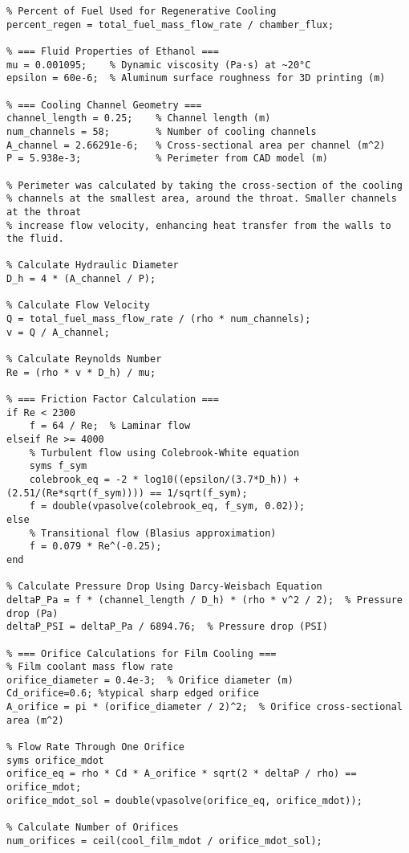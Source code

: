\begin{verbatim}
% Percent of Fuel Used for Regenerative Cooling
percent_regen = total_fuel_mass_flow_rate / chamber_flux;  

% === Fluid Properties of Ethanol ===
mu = 0.001095;    % Dynamic viscosity (Pa·s) at ~20°C
epsilon = 60e-6;  % Aluminum surface roughness for 3D printing (m)

% === Cooling Channel Geometry ===
channel_length = 0.25;    % Channel length (m)
num_channels = 58;        % Number of cooling channels
A_channel = 2.66291e-6;   % Cross-sectional area per channel (m^2)
P = 5.938e-3;             % Perimeter from CAD model (m)

% Perimeter was calculated by taking the cross-section of the cooling
% channels at the smallest area, around the throat. Smaller channels at the throat 
% increase flow velocity, enhancing heat transfer from the walls to the fluid.

% Calculate Hydraulic Diameter
D_h = 4 * (A_channel / P);  

% Calculate Flow Velocity
Q = total_fuel_mass_flow_rate / (rho * num_channels);  
v = Q / A_channel;    

% Calculate Reynolds Number
Re = (rho * v * D_h) / mu;

% === Friction Factor Calculation ===
if Re < 2300
    f = 64 / Re;  % Laminar flow
elseif Re >= 4000
    % Turbulent flow using Colebrook-White equation
    syms f_sym
    colebrook_eq = -2 * log10((epsilon/(3.7*D_h)) + (2.51/(Re*sqrt(f_sym)))) == 1/sqrt(f_sym);
    f = double(vpasolve(colebrook_eq, f_sym, 0.02)); 
else
    % Transitional flow (Blasius approximation)
    f = 0.079 * Re^(-0.25); 
end

% Calculate Pressure Drop Using Darcy-Weisbach Equation
deltaP_Pa = f * (channel_length / D_h) * (rho * v^2 / 2);  % Pressure drop (Pa)
deltaP_PSI = deltaP_Pa / 6894.76;  % Pressure drop (PSI)

% === Orifice Calculations for Film Cooling ===
% Film coolant mass flow rate
orifice_diameter = 0.4e-3;  % Orifice diameter (m)
Cd_orifice=0.6; %typical sharp edged orifice 
A_orifice = pi * (orifice_diameter / 2)^2;  % Orifice cross-sectional area (m^2)

% Flow Rate Through One Orifice
syms orifice_mdot
orifice_eq = rho * Cd * A_orifice * sqrt(2 * deltaP / rho) == orifice_mdot;
orifice_mdot_sol = double(vpasolve(orifice_eq, orifice_mdot));

% Calculate Number of Orifices
num_orifices = ceil(cool_film_mdot / orifice_mdot_sol);


\end{verbatim}
